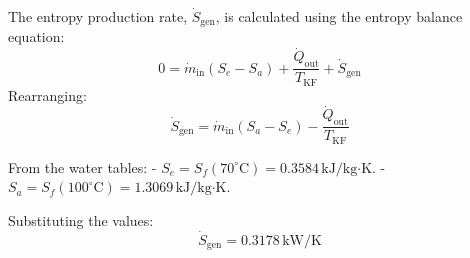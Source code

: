 The entropy production rate, \( \dot{S}_{\text{gen}} \), is calculated using the entropy balance equation:  
\[
0 = \dot{m}_{\text{in}} (S_e - S_a) + \frac{\dot{Q}_{\text{out}}}{T_{\text{KF}}} + \dot{S}_{\text{gen}}
\]  
Rearranging:  
\[
\dot{S}_{\text{gen}} = \dot{m}_{\text{in}} (S_a - S_e) - \frac{\dot{Q}_{\text{out}}}{T_{\text{KF}}}
\]  

From the water tables:  
- \( S_e = S_f(70^\circ\text{C}) = 0.3584 \, \text{kJ/kg·K} \).  
- \( S_a = S_f(100^\circ\text{C}) = 1.3069 \, \text{kJ/kg·K} \).  

Substituting the values:  
\[
\dot{S}_{\text{gen}} = 0.3178 \, \text{kW/K}
\]